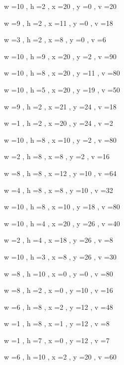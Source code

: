 \documentclass[11pt]{article}
\begin{document}
w =10 , h =2 , x =20 , y =0 , v =20
\par
w =9 , h =2 , x =11 , y =0 , v =18
\par
w =3 , h =2 , x =8 , y =0 , v =6
\par
w =10 , h =9 , x =20 , y =2 , v =90
\par
w =10 , h =8 , x =20 , y =11 , v =80
\par
w =10 , h =5 , x =20 , y =19 , v =50
\par
w =9 , h =2 , x =21 , y =24 , v =18
\par
w =1 , h =2 , x =20 , y =24 , v =2
\par
w =10 , h =8 , x =10 , y =2 , v =80
\par
w =2 , h =8 , x =8 , y =2 , v =16
\par
w =8 , h =8 , x =12 , y =10 , v =64
\par
w =4 , h =8 , x =8 , y =10 , v =32
\par
w =10 , h =8 , x =10 , y =18 , v =80
\par
w =10 , h =4 , x =20 , y =26 , v =40
\par
w =2 , h =4 , x =18 , y =26 , v =8
\par
w =10 , h =3 , x =8 , y =26 , v =30
\par
w =8 , h =10 , x =0 , y =0 , v =80
\par
w =8 , h =2 , x =0 , y =10 , v =16
\par
w =6 , h =8 , x =2 , y =12 , v =48
\par
w =1 , h =8 , x =1 , y =12 , v =8
\par
w =1 , h =7 , x =0 , y =12 , v =7
\par
w =6 , h =10 , x =2 , y =20 , v =60
\par
\newpage


\end{document}
